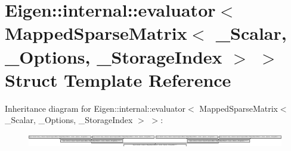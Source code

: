 \hypertarget{struct_eigen_1_1internal_1_1evaluator_3_01_mapped_sparse_matrix_3_01___scalar_00_01___options_00_01___storage_index_01_4_01_4}{}\section{Eigen\+:\+:internal\+:\+:evaluator$<$ Mapped\+Sparse\+Matrix$<$ \+\_\+\+Scalar, \+\_\+\+Options, \+\_\+\+Storage\+Index $>$ $>$ Struct Template Reference}
\label{struct_eigen_1_1internal_1_1evaluator_3_01_mapped_sparse_matrix_3_01___scalar_00_01___options_00_01___storage_index_01_4_01_4}
Inheritance diagram for Eigen\+:\+:internal\+:\+:evaluator$<$ Mapped\+Sparse\+Matrix$<$ \+\_\+\+Scalar, \+\_\+\+Options, \+\_\+\+Storage\+Index $>$ $>$\+:\begin{figure}[H]
\begin{center}
\leavevmode
\includegraphics[height=0.580913cm]{struct_eigen_1_1internal_1_1evaluator_3_01_mapped_sparse_matrix_3_01___scalar_00_01___options_00_01___storage_index_01_4_01_4}
\end{center}
\end{figure}
